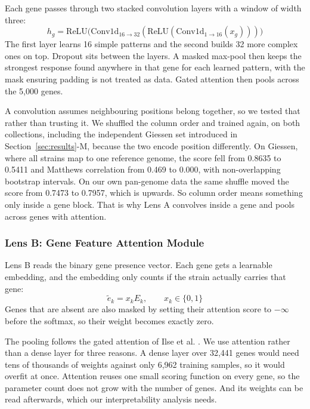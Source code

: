 \documentclass[conference]{IEEEtran}
\begin{document}
Each gene passes through two stacked convolution layers with a window of width
three:
\begin{equation}
h_g = \mathrm{ReLU}\big(\mathrm{Conv1d}_{16\rightarrow32}(\mathrm{ReLU}(\mathrm{Conv1d}_{1\rightarrow16}(x_g)))\big)
\end{equation}
The first layer learns 16 simple patterns and the second builds 32 more complex ones
on top. Dropout sits between the layers. A masked max-pool then keeps the strongest
response found anywhere in that gene for each learned pattern, with the mask
ensuring padding is not treated as data. Gated attention then pools across the
5{,}000 genes.

A convolution assumes neighbouring positions belong together, so we tested that
rather than trusting it. We shuffled the column order and trained again, on both
collections, including the independent Giessen set introduced in
Section~\ref{sec:results}-M, because the two encode position differently. On
Giessen, where all strains map to one reference genome, the score fell from 0.8635
to 0.5411 and Matthews correlation from 0.469 to 0.000, with non-overlapping
bootstrap intervals. On our own pan-genome data the same shuffle moved the score
from 0.7473 to 0.7957, which is upwards. So column order means something only inside
a gene block. That is why Lens A convolves inside a gene and pools across genes with
attention.

\subsubsection{Lens B: Gene Feature Attention Module}

Lens B reads the binary gene presence vector. Each gene gets a learnable
embedding, and the embedding only counts if the strain actually carries that gene:
\begin{equation}
\tilde{e}_k = x_k E_k, \qquad x_k \in \{0,1\}
\end{equation}
Genes that are absent are also masked by setting their attention score to
$-\infty$ before the softmax, so their weight becomes exactly zero.

The pooling follows the gated attention of Ilse et al. \cite{ilse2018}. We use
attention rather than a dense layer for three reasons. A dense layer over 32{,}441
genes would need tens of thousands of weights against only 6{,}962 training samples,
so it would overfit at once. Attention reuses one small scoring function on every
gene, so the parameter count does not grow with the number of genes. And its weights
can be read afterwards, which our interpretability analysis needs.
\end{document}
